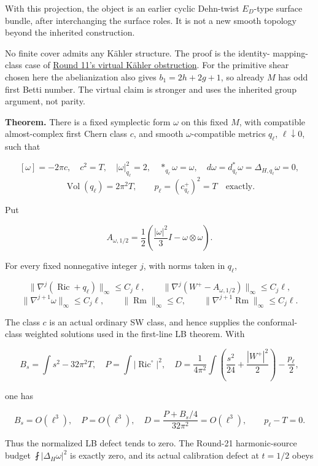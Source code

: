 \documentclass[
  11pt,
]{article}
\begin{document}
With this projection, the object is an earlier cyclic Dehn-twist
\(E_D\)-type surface bundle, after interchanging the surface roles. It
is not a new smooth topology beyond the inherited construction.

No finite cover admits any Kähler structure. The proof is the identity-
mapping-class case of \href{round11_kahler.md}{Round 11's virtual Kähler
obstruction}. For the primitive shear chosen here the abelianization
also gives \(b_1=2h+2g+1\), so already \(M\) has odd first Betti number.
The virtual claim is stronger and uses the inherited group argument, not
parity.

\textbf{Theorem.} There is a fixed symplectic form \(\omega\) on this
fixed \(M\), with compatible almost-complex first Chern class \(c\), and
smooth \(\omega\)-compatible metrics \(q_\ell\), \(\ell\downarrow0\),
such that

\[
 [\omega]=-2\pi c,\quad c^2=T,\quad
 |\omega|_{q_\ell}^2=2,\quad *_{q_\ell}\omega=\omega,\quad
 d\omega=d^*_{q_\ell}\omega=\Delta_{H,q_\ell}\omega=0,
 \tag{3}
\] \[
 \operatorname{Vol}(q_\ell)=2\pi^2 T,\qquad
 p_\ell=(c_{q_\ell}^+)^2=T\quad\text{exactly}.
 \tag{4}
\]

Put

\[
 A_{\omega,1/2}=\frac12\left(\frac{|\omega|^2}{3}I-
                                      \omega\otimes\omega\right).
\]

For every fixed nonnegative integer \(j\), with norms taken in
\(q_\ell\),

\[
 \|\nabla^j(\operatorname{Ric}+q_\ell)\|_\infty\le C_j\ell,
 \qquad
 \|\nabla^j(W^+-A_{\omega,1/2})\|_\infty\le C_j\ell,
 \tag{5}
\] \[
 \|\nabla^{j+1}\omega\|_\infty\le C_j\ell,
 \qquad \|\operatorname{Rm}\|_\infty\le C,
 \qquad \|\nabla^{j+1}\operatorname{Rm}\|_\infty\le C_j\ell.
 \tag{6}
\]

The class \(c\) is an actual ordinary SW class, and hence supplies the
conformal-class weighted solutions used in the first-line LB theorem.
With

\[
 B_s=\int s^2-32\pi^2 T,\quad
 P=\int|\operatorname{Ric}^{\circ}|^2,\quad
 D=\frac1{4\pi^2}\int\left(\frac{s^2}{24}+
                              \frac{|W^+|^2}{2}\right)-\frac{p_\ell}{2},
\]

one has

\[
 B_s=O(\ell^3),\quad P=O(\ell^3),\quad
 \boxed{D=\frac{P+B_s/4}{32\pi^2}=O(\ell^3),\qquad p_\ell-T=0.}
 \tag{7}
\]

Thus the normalized LB defect tends to zero. The Round-21
harmonic-source budget \(\fint|\Delta_H\omega|^2\) is exactly zero, and
its actual calibration defect at \(t=1/2\) obeys
\end{document}
